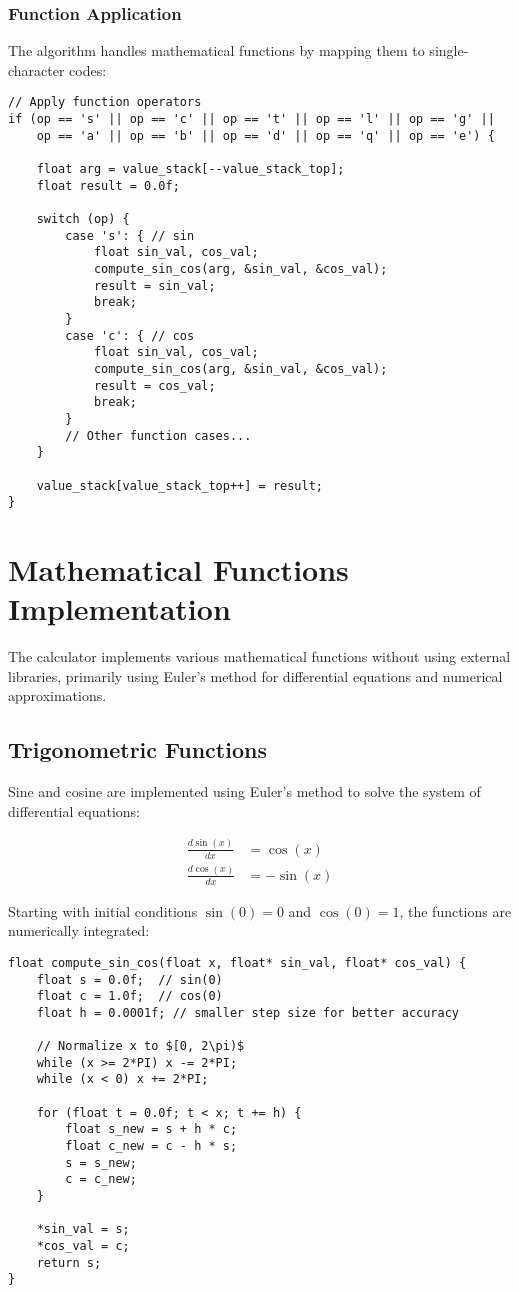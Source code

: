 \documentclass[12pt,a4paper]{article}
\begin{document}
\subsubsection{Function Application}
The algorithm handles mathematical functions by mapping them to single-character codes:

\begin{lstlisting}
// Apply function operators
if (op == 's' || op == 'c' || op == 't' || op == 'l' || op == 'g' || 
    op == 'a' || op == 'b' || op == 'd' || op == 'q' || op == 'e') {
    
    float arg = value_stack[--value_stack_top];
    float result = 0.0f;
    
    switch (op) {
        case 's': { // sin
            float sin_val, cos_val;
            compute_sin_cos(arg, &sin_val, &cos_val);
            result = sin_val;
            break;
        }
        case 'c': { // cos
            float sin_val, cos_val;
            compute_sin_cos(arg, &sin_val, &cos_val);
            result = cos_val;
            break;
        }
        // Other function cases...
    }
    
    value_stack[value_stack_top++] = result;
}
\end{lstlisting}

\section{Mathematical Functions Implementation}

The calculator implements various mathematical functions without using external libraries, primarily using Euler's method for differential equations and numerical approximations.

\subsection{Trigonometric Functions}

Sine and cosine are implemented using Euler's method to solve the system of differential equations:

\begin{align}
\frac{d\sin(x)}{dx} &= \cos(x)\\
\frac{d\cos(x)}{dx} &= -\sin(x)
\end{align}

Starting with initial conditions $\sin(0) = 0$ and $\cos(0) = 1$, the functions are numerically integrated:

\begin{lstlisting}
float compute_sin_cos(float x, float* sin_val, float* cos_val) {
    float s = 0.0f;  // sin(0)
    float c = 1.0f;  // cos(0)
    float h = 0.0001f; // smaller step size for better accuracy
    
    // Normalize x to $[0, 2\pi)$
    while (x >= 2*PI) x -= 2*PI;
    while (x < 0) x += 2*PI;
    
    for (float t = 0.0f; t < x; t += h) {
        float s_new = s + h * c;
        float c_new = c - h * s;
        s = s_new;
        c = c_new;
    }
    
    *sin_val = s;
    *cos_val = c;
    return s;
}
\end{lstlisting}
\end{document}
